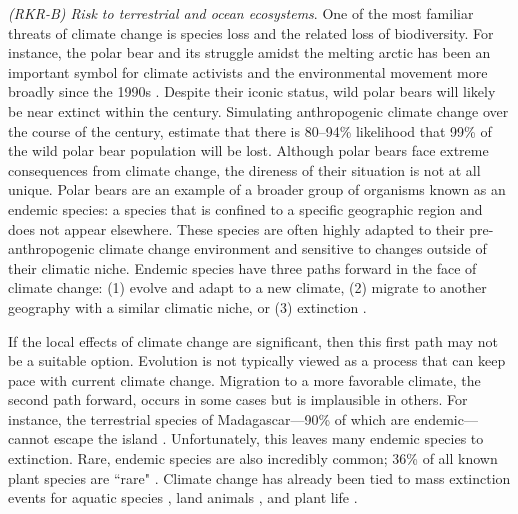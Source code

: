 \textit{(RKR-B) Risk to terrestrial and ocean ecosystems}. One of the most familiar threats of climate change is species loss and the related loss of biodiversity. For instance, the polar bear and its struggle amidst the melting arctic has been an important symbol for climate activists and the environmental movement more broadly since the 1990s \citep{slocum2004polar}. Despite their iconic status, wild polar bears will likely be near extinct within the century.  Simulating anthropogenic climate change over the course of the century, \cite{hunter2010climate} estimate that there is 80--94\% likelihood that 99\% of the wild polar bear population will be lost. Although polar bears face extreme consequences from climate change, the direness of their situation is not at all unique. Polar bears are an example of a broader group of organisms known as an endemic species: a species that is confined to a specific geographic region and does not appear elsewhere. These species are often highly adapted to their pre-anthropogenic climate change environment and sensitive to changes outside of their climatic niche. Endemic species have three paths forward in the face of climate change: (1) evolve and adapt to a new climate, (2) migrate to another geography with a similar climatic niche, or (3) extinction \citep{wiens2016climate}. 

If the local effects of climate change are significant, then this first path may not be a suitable option. Evolution is not typically viewed as a process that can keep pace with current climate change. Migration to a more favorable climate, the second path forward,  occurs in some cases but is implausible in others. For instance, the terrestrial species of Madagascar---90\% of which are endemic---cannot escape the island \citep{ralimanana2022madagascar}. Unfortunately, this leaves many endemic species to extinction. Rare, endemic species are also incredibly common; 36\% of all known plant species are ``rare" \citep{enquist2019commonness}. Climate change has already been tied to mass extinction events for aquatic species \citep{till2019fish}, land animals \citep{fey2015recent}, and plant life \citep{wiens2016climate}.

